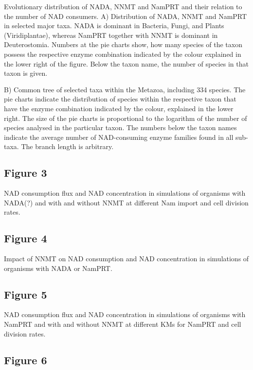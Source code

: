 Evolutionary distribution of NADA, NNMT and NamPRT and their relation to the number of NAD consumers. A) Distribution of NADA, NNMT and NamPRT in selected major taxa. NADA is dominant in Bacteria, Fungi, and Plants (Viridiplantae), whereas NamPRT together with NNMT is dominant in Deuterostomia. Numbers at the pie charts show, how many species of the taxon possess the respective enzyme combination indicated by the colour explained in the lower right of the figure. Below the taxon name, the number of species in that taxon is given.

B) Common tree of selected taxa within the Metazoa, including 334 species. The pie charts indicate the distribution of species within the respective taxon that have the enzyme combination indicated by the colour, explained in the lower right. The size of the pie charts is proportional to the logarithm of the number of species analysed in the particular taxon. The numbers below the taxon names indicate the average number of NAD-consuming enzyme families found in all sub-taxa. The branch length is arbitrary.


\subsection{Figure 3}

NAD consumption flux and NAD concentration in simulations of organisms with NADA(?) and with and without NNMT at different Nam import and cell division rates.


\subsection{Figure 4}

Impact of NNMT on NAD consumption and NAD concentration in simulations of organisms with NADA or NamPRT.


\subsection{Figure 5}

NAD consumption flux and NAD concentration in simulations of organisms with NamPRT and with and without NNMT at different KMs for NamPRT and cell division rates.


\subsection{Figure 6}

